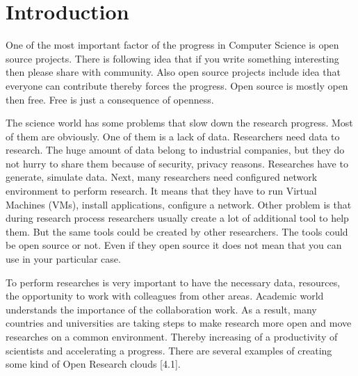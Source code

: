 \section{Introduction}

One of the most important factor of the progress in Computer Science is open source projects. There is following idea that if you write something interesting then please share with community. Also open source projects include idea that everyone can contribute thereby forces the progress. Open source is mostly open then free. Free is just a consequence of openness. 

The science world has some problems that slow down the research progress. Most of them are obviously. One of them is a lack of data. Researchers need data to research. The huge amount of data belong to industrial companies, but they do not hurry to share them because of security, privacy reasons. Researches have to generate, simulate data. Next, many researchers need configured network environment to perform research. It means that they have to run Virtual Machines (VMs), install applications, configure a network. Other problem is that during research process researchers usually create a lot of additional tool to help them. But the same tools could be created by other researchers. The tools could be open source or not. Even if they open source it does not mean that you can use in your particular case.  
 
To perform researches is very important to have the necessary data, resources, the opportunity to work with colleagues from other areas. Academic world understands the importance of the collaboration work. As a result, many countries and universities are taking steps to make research more open and move researches on a common environment. Thereby increasing of a productivity of scientists and accelerating a progress. There are several examples of creating some kind of Open Research clouds [4.1].

